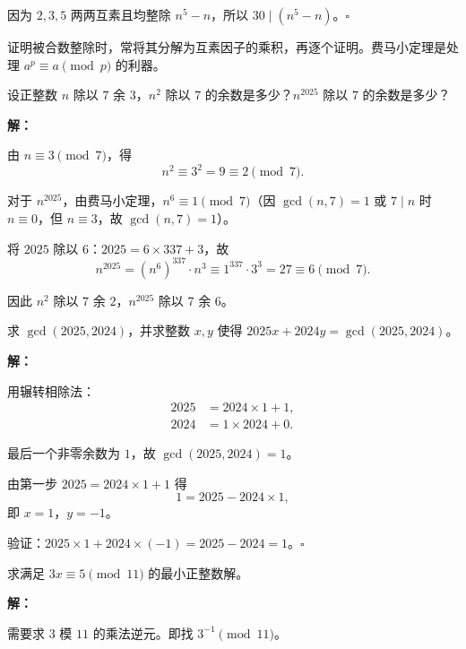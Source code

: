 \documentclass[12pt, a4paper]{ctexart}
\begin{document}
因为 $2, 3, 5$ 两两互素且均整除 $n^5 - n$，所以 $30 \mid (n^5 - n)$。\hfill $\square$

\begin{tipbox}[方法总结]
证明被合数整除时，常将其分解为互素因子的乘积，再逐个证明。费马小定理是处理 $a^p \equiv a \pmod{p}$ 的利器。
\end{tipbox}

\begin{examplebox}[【例题2】带余除法的综合]
设正整数 $n$ 除以 $7$ 余 $3$，$n^2$ 除以 $7$ 的余数是多少？$n^{2025}$ 除以 $7$ 的余数是多少？
\end{examplebox}

\textbf{解：}

由 $n \equiv 3 \pmod{7}$，得
\[ n^2 \equiv 3^2 = 9 \equiv 2 \pmod{7}. \]

对于 $n^{2025}$，由费马小定理，$n^6 \equiv 1 \pmod{7}$（因 $\gcd(n, 7) = 1$ 或 $7 \mid n$ 时 $n \equiv 0$，但 $n \equiv 3$，故 $\gcd(n,7)=1$）。

将 $2025$ 除以 $6$：$2025 = 6 \times 337 + 3$，故
\[ n^{2025} = (n^6)^{337} \cdot n^3 \equiv 1^{337} \cdot 3^3 = 27 \equiv 6 \pmod{7}. \]

因此 $n^2$ 除以 $7$ 余 $\boxed{2}$，$n^{2025}$ 除以 $7$ 余 $\boxed{6}$。

\begin{examplebox}[【例题3】辗转相除法求最大公因数]
求 $\gcd(2025, 2024)$，并求整数 $x, y$ 使得 $2025x + 2024y = \gcd(2025, 2024)$。
\end{examplebox}

\textbf{解：}

用辗转相除法：
\begin{align*}
2025 &= 2024 \times 1 + 1, \\
2024 &= 1 \times 2024 + 0.
\end{align*}

最后一个非零余数为 $1$，故 $\gcd(2025, 2024) = 1$。

由第一步 $2025 = 2024 \times 1 + 1$ 得
\[ 1 = 2025 - 2024 \times 1, \]
即 $x = 1$，$y = -1$。

验证：$2025 \times 1 + 2024 \times (-1) = 2025 - 2024 = 1$。\hfill $\square$

\begin{examplebox}[【例题4】同余方程]
求满足 $3x \equiv 5 \pmod{11}$ 的最小正整数解。
\end{examplebox}

\textbf{解：}

需要求 $3$ 模 $11$ 的乘法逆元。即找 $3^{-1} \pmod{11}$。
\end{document}
